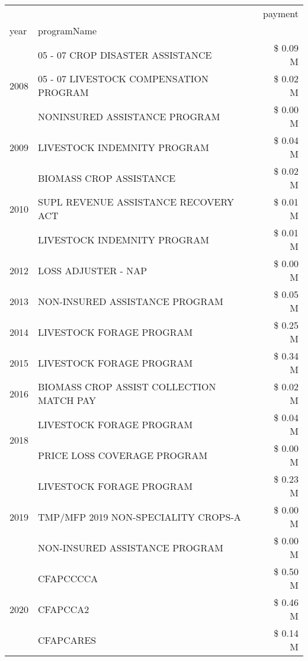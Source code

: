 \begin{tabular}{llr}
\toprule
 &  & payment \\
year & programName &  \\
\midrule
\multirow[t]{3}{*}{2008} & 05 - 07 CROP DISASTER ASSISTANCE & \$ 0.09 M \\
 & 05 - 07 LIVESTOCK COMPENSATION PROGRAM & \$ 0.02 M \\
 & NONINSURED ASSISTANCE PROGRAM & \$ 0.00 M \\
\cline{1-3}
2009 & LIVESTOCK INDEMNITY PROGRAM & \$ 0.04 M \\
\cline{1-3}
\multirow[t]{3}{*}{2010} & BIOMASS CROP ASSISTANCE & \$ 0.02 M \\
 & SUPL REVENUE ASSISTANCE RECOVERY ACT & \$ 0.01 M \\
 & LIVESTOCK INDEMNITY PROGRAM & \$ 0.01 M \\
\cline{1-3}
2012 & LOSS ADJUSTER - NAP & \$ 0.00 M \\
\cline{1-3}
2013 & NON-INSURED ASSISTANCE PROGRAM & \$ 0.05 M \\
\cline{1-3}
2014 & LIVESTOCK FORAGE PROGRAM & \$ 0.25 M \\
\cline{1-3}
2015 & LIVESTOCK FORAGE PROGRAM & \$ 0.34 M \\
\cline{1-3}
2016 & BIOMASS CROP ASSIST COLLECTION MATCH PAY      & \$ 0.02 M \\
\cline{1-3}
\multirow[t]{2}{*}{2018} & LIVESTOCK FORAGE PROGRAM & \$ 0.04 M \\
 & PRICE LOSS COVERAGE PROGRAM & \$ 0.00 M \\
\cline{1-3}
\multirow[t]{3}{*}{2019} & LIVESTOCK FORAGE PROGRAM & \$ 0.23 M \\
 & TMP/MFP 2019 NON-SPECIALITY CROPS-A & \$ 0.00 M \\
 & NON-INSURED ASSISTANCE PROGRAM & \$ 0.00 M \\
\cline{1-3}
\multirow[t]{3}{*}{2020} & CFAPCCCCA & \$ 0.50 M \\
 & CFAPCCA2 & \$ 0.46 M \\
 & CFAPCARES & \$ 0.14 M \\
\cline{1-3}
\bottomrule
\end{tabular}
